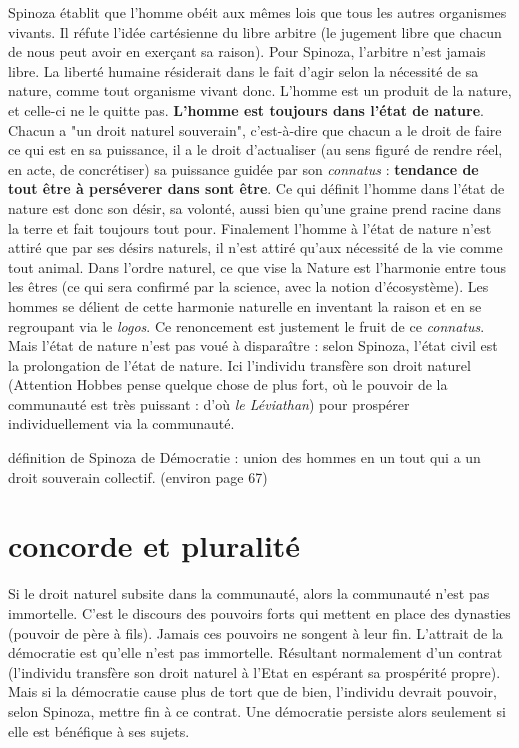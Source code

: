 \documentclass[a4paper,12pt]{article}
\begin{document}
Spinoza établit que l'homme obéit aux mêmes lois que tous les autres organismes vivants. Il réfute l'idée cartésienne du libre arbitre (le jugement libre que chacun de nous peut avoir en exerçant sa raison). Pour Spinoza, l'arbitre n'est jamais libre. La liberté humaine résiderait dans le fait d'agir selon la nécessité de sa nature, comme tout organisme vivant donc. L'homme est un produit de la nature, et celle-ci ne le quitte pas. \textbf{L'homme est toujours dans l'état de nature}. Chacun a "un droit naturel souverain", c'est-à-dire que chacun a le droit de faire ce qui est en sa puissance, il a le droit d'actualiser (au sens figuré de rendre réel, en acte, de concrétiser) sa puissance guidée par son \textit{connatus} : \textbf{tendance de tout être à perséverer dans sont être}. Ce qui définit l'homme dans l'état de nature est donc son désir, sa volonté, aussi bien qu'une graine prend racine dans la terre et fait toujours tout pour. Finalement l'homme à l'état de nature n'est attiré que par ses désirs naturels, il n'est attiré qu'aux nécessité de la vie comme tout animal. Dans l'ordre naturel, ce que vise la Nature est l'harmonie entre tous les êtres (ce qui sera confirmé par la  science, avec la notion d'écosystème). Les hommes se délient de cette harmonie naturelle en inventant la raison et en se regroupant via le \textit{logos}. Ce renoncement est justement le fruit de ce \textit{connatus}. Mais l'état de nature n'est pas voué à disparaître : selon Spinoza, l'état civil est la prolongation de l'état de nature. Ici l'individu transfère son droit naturel (Attention Hobbes pense quelque chose de plus fort, où le pouvoir de la  communauté est très puissant : d'où \textit{le Léviathan}) pour prospérer individuellement via la communauté.

définition de Spinoza de Démocratie : union des hommes en un tout qui a un droit souverain collectif. (environ page 67)

\section{concorde et pluralité}

Si le droit naturel subsite dans la communauté, alors la communauté n'est pas immortelle. C'est le discours des pouvoirs forts qui mettent en place des dynasties (pouvoir de père à fils). Jamais ces pouvoirs ne songent à leur fin.
L'attrait de la démocratie est qu'elle n'est pas immortelle. Résultant normalement d'un contrat (l'individu transfère son droit naturel à l'Etat en espérant sa prospérité propre). Mais si la démocratie cause plus de tort que de bien, l'individu devrait pouvoir, selon Spinoza, mettre fin à ce contrat. Une démocratie persiste alors seulement si elle est bénéfique à ses sujets.\\
\end{document}
